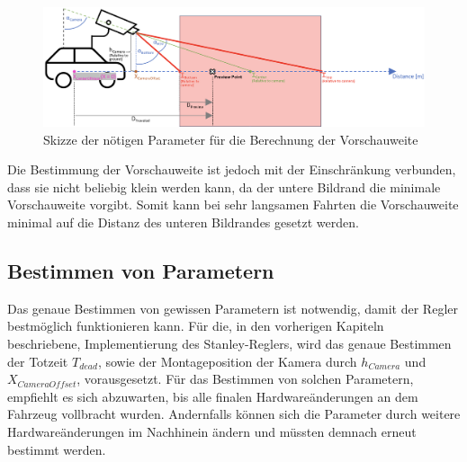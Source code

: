 \begin{figure}[H]
    \centering
    \includegraphics[width=1\linewidth]{Pictures/Bildschirmfoto 2024-02-05 um 01.49.52.png}
    \caption{Skizze der nötigen Parameter für die Berechnung der Vorschauweite}
    \label{fig:skizze_parameter_vorschauweite}
\end{figure}

Die Bestimmung der Vorschauweite ist jedoch mit der Einschränkung verbunden, dass sie nicht beliebig klein werden kann, da der untere Bildrand die minimale Vorschauweite vorgibt. Somit kann bei sehr langsamen Fahrten die Vorschauweite minimal auf die Distanz des unteren Bildrandes gesetzt werden. 


\subsection{Bestimmen von Parametern}

Das genaue Bestimmen von gewissen Parametern ist notwendig, damit der Regler bestmöglich funktionieren kann. Für die, in den vorherigen Kapiteln beschriebene, Implementierung des Stanley-Reglers, wird das genaue Bestimmen der Totzeit \(T_{dead}\), sowie der Montageposition der Kamera durch \(h_{Camera}\) und \(X_{CameraOffset}\), vorausgesetzt. 
Für das Bestimmen von solchen Parametern, empfiehlt es sich abzuwarten, bis alle finalen Hardwareänderungen an dem Fahrzeug vollbracht wurden. Andernfalls können sich die Parameter durch weitere Hardwareänderungen im Nachhinein ändern und müssten demnach erneut bestimmt werden.
